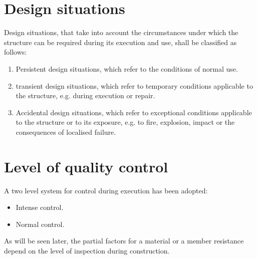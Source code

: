 

\section{Design situations} \label{sc_situaciones}
Design situations, that take into account the circumstances under which the structure can be required during its execution and use, shall be classified as follows:

\begin{enumerate}
\item Persistent design situations, which refer to the conditions of normal use.
\item transient design situations, which refer to temporary conditions applicable to the structure, e.g. during execution or repair.
\item Accidental design situations, which refer to exceptional conditions applicable to the structure or to its exposure, e.g. to fire, explosion, impact or the consequences of localised failure.
\end{enumerate}

\section{Level of quality control}
A two level system for control during execution has been adopted:

\begin{itemize}
\item Intense control.
\item Normal control.
\end{itemize}

As will be seen later, the partial factors for a material or a member resistance depend on the level of inspection during construction.









